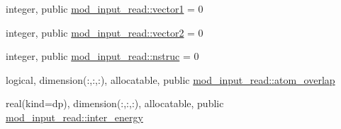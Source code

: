 \begin{DoxyCompactItemize}
\item 
integer, public \hyperlink{namespacemod__input__read_a6e68357b53efca593488929b4554838d}{mod\+\_\+input\+\_\+read\+::vector1} = 0
\item 
integer, public \hyperlink{namespacemod__input__read_a4f1ca96e94c5298b480fa8d43bb1b915}{mod\+\_\+input\+\_\+read\+::vector2} = 0
\item 
integer, public \hyperlink{namespacemod__input__read_a8aa83854894f2e947a4e1015697433d0}{mod\+\_\+input\+\_\+read\+::nstruc} = 0
\item 
logical, dimension(\+:,\+:,\+:), allocatable, public \hyperlink{namespacemod__input__read_ada662a2d234d567ce7da80355d2c9e21}{mod\+\_\+input\+\_\+read\+::atom\+\_\+overlap}
\item 
real(kind=dp), dimension(\+:,\+:,\+:), allocatable, public \hyperlink{namespacemod__input__read_a59e3573d7d32b72bd699ac1708e70908}{mod\+\_\+input\+\_\+read\+::inter\+\_\+energy}
\end{DoxyCompactItemize}
